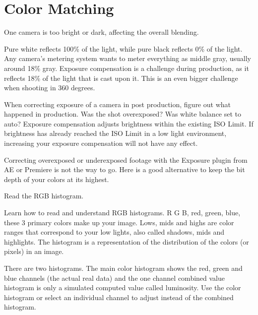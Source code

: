 \chapter{Color Matching}
\pagecolor{white}
\label{chap:32}
\begin{fullwidth}


\problem

{\large One camera is too bright or dark, affecting the overall blending. \par}

Pure white reflects 100\% of the light, while pure black reflects 0\% of the light. Any camera’s metering system wants to meter everything as middle gray, usually around 18\% gray. Exposure compensation is a challenge during production, as it reflects 18\% of the light that is cast upon it. This is an even bigger challenge when shooting in 360 degrees. 

When correcting exposure of a camera in post production, figure out what happened in production. Was the shot overexposed? Was white balance set to auto? Exposure compensation adjusts brightness within the existing ISO Limit. If brightness has already reached the ISO Limit in a low light environment, increasing your exposure compensation will not have any effect.


Correcting overexposed or underexposed footage with the Exposure plugin from AE or Premiere is not the way to go. Here is a good alternative to keep the bit depth of your colors at its highest.

\clearpage
\solution

{\large Read the RGB histogram. \par}


Learn how to read and understand RGB histograms. R G B, red, green, blue, these 3 primary colors make up your image. Lows, mids and highs are color ranges that correspond to your low lights, also called shadows, mids and highlights. The histogram is a representation of the distribution of the colors (or pixels) in an image. 

There are two histograms. The main color histogram shows the red, green and blue channels (the actual real data) and the one channel combined value histogram is only a simulated computed value called luminosity. Use the color histogram or select an individual channel to adjust instead of the combined histogram.


\end{fullwidth}
